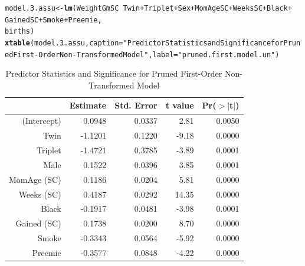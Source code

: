 \documentclass{article}\usepackage[]{graphicx}\usepackage[]{xcolor}
\makeatletter
\newcommand{\hlstr}[1]{\textcolor[rgb]{0.192,0.494,0.8}{#1}}%
\newcommand{\hlopt}[1]{\textcolor[rgb]{0,0,0}{#1}}%
\newcommand{\hlstd}[1]{\textcolor[rgb]{0.345,0.345,0.345}{#1}}%
\newcommand{\hlkwb}[1]{\textcolor[rgb]{0.69,0.353,0.396}{#1}}%
\newcommand{\hlkwc}[1]{\textcolor[rgb]{0.333,0.667,0.333}{#1}}%
\newcommand{\hlkwd}[1]{\textcolor[rgb]{0.737,0.353,0.396}{\textbf{#1}}}%
\newenvironment{kframe}{%
 \def\at@end@of@kframe{}%
 \ifinner\ifhmode%
  \def\at@end@of@kframe{\end{minipage}}%
  \begin{minipage}{\columnwidth}%
 \fi\fi%
 \def\FrameCommand##1{\hskip\@totalleftmargin \hskip-\fboxsep
 \colorbox{shadecolor}{##1}\hskip-\fboxsep
     \hskip-\linewidth \hskip-\@totalleftmargin \hskip\columnwidth}%
 \MakeFramed {\advance\hsize-\width
   \@totalleftmargin\z@ \linewidth\hsize
   \@setminipage}}%
 {\par\unskip\endMakeFramed%
 \at@end@of@kframe}
\newenvironment{knitrout}{}{} %
\makeatother
\begin{document}
\begin{knitrout}
\color{fgcolor}\begin{kframe}
\begin{alltt}
\hlstd{model.3.assu} \hlkwb{<-} \hlkwd{lm}\hlstd{(WeightGmSC} \hlopt{~} \hlstd{Twin} \hlopt{+} \hlstd{Triplet} \hlopt{+} \hlstd{Sex} \hlopt{+} \hlstd{MomAgeSC} \hlopt{+} \hlstd{WeeksSC} \hlopt{+} \hlstd{Black} \hlopt{+}
                      \hlstd{GainedSC} \hlopt{+} \hlstd{Smoke} \hlopt{+} \hlstd{Preemie,}
                    \hlstd{births)}
\hlkwd{xtable}\hlstd{(model.3.assu,} \hlkwc{caption}\hlstd{=}\hlstr{"Predictor Statistics and Significance for Pruned First-Order Non-Transformed Model"}\hlstd{,} \hlkwc{label}\hlstd{=}\hlstr{"pruned.first.model.un"}\hlstd{)}
\end{alltt}
\end{kframe}
\end{knitrout}
\begin{table}[H]
\centering
\begin{tabular}{rrrrr}
  \hline
 & Estimate & Std. Error & t value & Pr($>$$|$t$|$) \\ 
  \hline
(Intercept) & 0.0948 & 0.0337 & 2.81 & 0.0050 \\ 
  Twin & -1.1201 & 0.1220 & -9.18 & 0.0000 \\ 
  Triplet & -1.4721 & 0.3785 & -3.89 & 0.0001 \\ 
  Male & 0.1522 & 0.0396 & 3.85 & 0.0001 \\ 
  MomAge (SC) & 0.1186 & 0.0204 & 5.81 & 0.0000 \\ 
  Weeks (SC) & 0.4187 & 0.0292 & 14.35 & 0.0000 \\ 
  Black & -0.1917 & 0.0481 & -3.98 & 0.0001 \\ 
  Gained (SC) & 0.1738 & 0.0200 & 8.70 & 0.0000 \\ 
  Smoke & -0.3343 & 0.0564 & -5.92 & 0.0000 \\ 
  Preemie & -0.3577 & 0.0848 & -4.22 & 0.0000 \\ 
   \hline
\end{tabular}
\caption{Predictor Statistics and Significance for Pruned First-Order Non-Transformed Model} 
\label{pruned.first.model.un}
\end{table}
\end{document}
